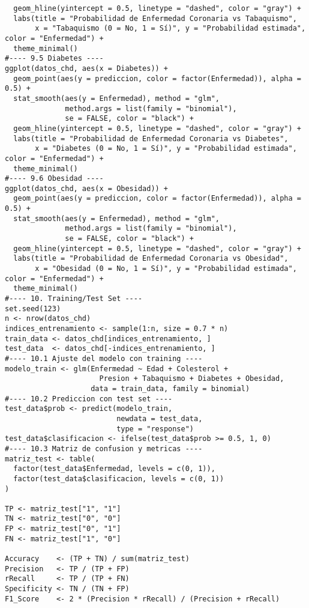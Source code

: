 \documentclass[12pt]{article}
\begin{document}
\begin{verbatim}
  geom_hline(yintercept = 0.5, linetype = "dashed", color = "gray") +
  labs(title = "Probabilidad de Enfermedad Coronaria vs Tabaquismo",
       x = "Tabaquismo (0 = No, 1 = Sí)", y = "Probabilidad estimada", color = "Enfermedad") +
  theme_minimal()
#---- 9.5 Diabetes ----
ggplot(datos_chd, aes(x = Diabetes)) +
  geom_point(aes(y = prediccion, color = factor(Enfermedad)), alpha = 0.5) +
  stat_smooth(aes(y = Enfermedad), method = "glm", 
              method.args = list(family = "binomial"), 
              se = FALSE, color = "black") +
  geom_hline(yintercept = 0.5, linetype = "dashed", color = "gray") +
  labs(title = "Probabilidad de Enfermedad Coronaria vs Diabetes",
       x = "Diabetes (0 = No, 1 = Sí)", y = "Probabilidad estimada", color = "Enfermedad") +
  theme_minimal()
#---- 9.6 Obesidad ----
ggplot(datos_chd, aes(x = Obesidad)) +
  geom_point(aes(y = prediccion, color = factor(Enfermedad)), alpha = 0.5) +
  stat_smooth(aes(y = Enfermedad), method = "glm", 
              method.args = list(family = "binomial"), 
              se = FALSE, color = "black") +
  geom_hline(yintercept = 0.5, linetype = "dashed", color = "gray") +
  labs(title = "Probabilidad de Enfermedad Coronaria vs Obesidad",
       x = "Obesidad (0 = No, 1 = Sí)", y = "Probabilidad estimada", color = "Enfermedad") +
  theme_minimal()
#---- 10. Training/Test Set ----
set.seed(123)
n <- nrow(datos_chd)
indices_entrenamiento <- sample(1:n, size = 0.7 * n)
train_data <- datos_chd[indices_entrenamiento, ]
test_data  <- datos_chd[-indices_entrenamiento, ]
#---- 10.1 Ajuste del modelo con training ----
modelo_train <- glm(Enfermedad ~ Edad + Colesterol + 
                      Presion + Tabaquismo + Diabetes + Obesidad,
                    data = train_data, family = binomial)
#---- 10.2 Prediccion con test set ----
test_data$prob <- predict(modelo_train, 
                          newdata = test_data, 
                          type = "response")
test_data$clasificacion <- ifelse(test_data$prob >= 0.5, 1, 0)
#---- 10.3 Matriz de confusion y metricas ----
matriz_test <- table(
  factor(test_data$Enfermedad, levels = c(0, 1)),
  factor(test_data$clasificacion, levels = c(0, 1))
)

TP <- matriz_test["1", "1"]
TN <- matriz_test["0", "0"]
FP <- matriz_test["0", "1"]
FN <- matriz_test["1", "0"]

Accuracy    <- (TP + TN) / sum(matriz_test)
Precision   <- TP / (TP + FP)
rRecall     <- TP / (TP + FN)
Specificity <- TN / (TN + FP)
F1_Score    <- 2 * (Precision * rRecall) / (Precision + rRecall)


\end{verbatim}
\end{document}
